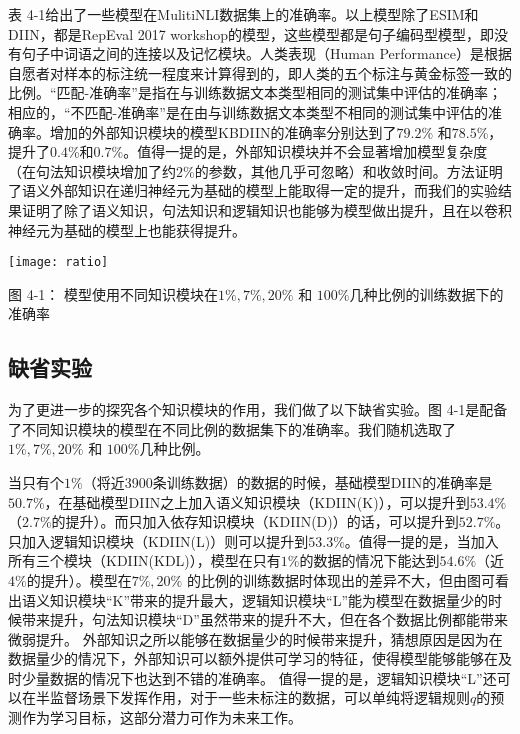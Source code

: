 \documentclass[UTF8,11pt,a4paper,nofonts]{ctexart}
\numberwithin{equation}{section}
\begin{document}
表 4-1给出了一些模型在MulitiNLI数据集上的准确率。以上模型除了ESIM和DIIN，都是RepEval 2017 workshop的模型，这些模型都是句子编码型模型，即没有句子中词语之间的连接以及记忆模块。人类表现（Human Performance）是根据自愿者对样本的标注统一程度来计算得到的，即人类的五个标注与黄金标签一致的比例。“匹配-准确率”是指在与训练数据文本类型相同的测试集中评估的准确率；相应的，“不匹配-准确率”是在由与训练数据文本类型不相同的测试集中评估的准确率。增加的外部知识模块的模型KBDIIN的准确率分别达到了$79.2\%$ 和$78.5\%$，提升了$0.4\%$和$0.7\%$。值得一提的是，外部知识模块并不会显著增加模型复杂度（在句法知识模块增加了约$2\%$的参数，其他几乎可忽略）和收敛时间。\cite{Chen2017NaturalLI}方法证明了语义外部知识在递归神经元为基础的模型上能取得一定的提升，而我们的实验结果证明了除了语义知识，句法知识和逻辑知识也能够为模型做出提升，且在以卷积神经元为基础的模型上也能获得提升。



\begin{table}[htbp!]
\centering
\texttt{[image: ratio]}
\caption*{图 4-1： 模型使用不同知识模块在$1\%, 7\%, 20\%$ 和 $100\%$几种比例的训练数据下的准确率}%
\end{table}


\subsection{缺省实验}

为了更进一步的探究各个知识模块的作用，我们做了以下缺省实验。图 4-1是配备了不同知识模块的模型在不同比例的数据集下的准确率。我们随机选取了$1\%, 7\%, 20\%$ 和 $100\%$几种比例。



当只有个$1\%$（将近3900条训练数据）的数据的时候，基础模型DIIN的准确率是$50.7\%$，在基础模型DIIN之上加入语义知识模块（KDIIN(K)），可以提升到$53.4\%$（$2.7\%$的提升）。而只加入依存知识模块（KDIIN(D)）的话，可以提升到$52.7\%$。只加入逻辑知识模块（KDIIN(L)）则可以提升到$53.3\%$。值得一提的是，当加入所有三个模块（KDIIN(KDL)），模型在只有$1\%$的数据的情况下能达到$54.6\%$（近$4\%$的提升）。模型在$7\%, 20\%$ 的比例的训练数据时体现出的差异不大，但由图可看出语义知识模块“K”带来的提升最大，逻辑知识模块“L”能为模型在数据量少的时候带来提升，句法知识模块“D”虽然带来的提升不大，但在各个数据比例都能带来微弱提升。
外部知识之所以能够在数据量少的时候带来提升，猜想原因是因为在数据量少的情况下，外部知识可以额外提供可学习的特征，使得模型能够能够在及时少量数据的情况下也达到不错的准确率。
值得一提的是，逻辑知识模块“L”还可以在半监督场景下发挥作用，对于一些未标注的数据，可以单纯将逻辑规则$q$的预测作为学习目标，这部分潜力可作为未来工作。
\end{document}
